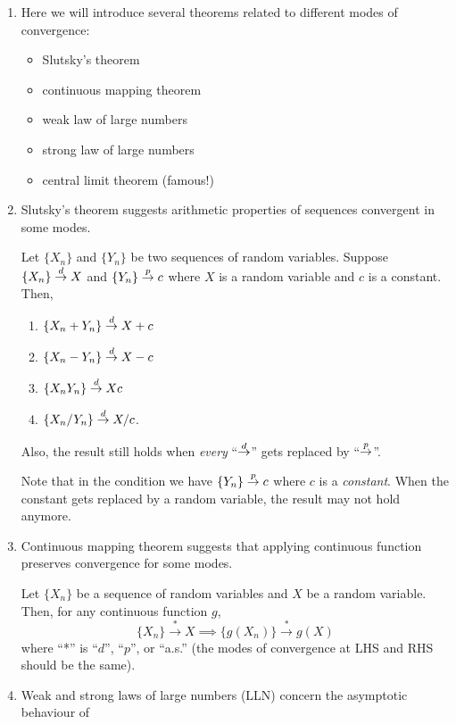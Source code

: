 \begin{enumerate}
\item Here we will introduce several theorems related to different modes of
convergence:
\begin{itemize}
\item Slutsky's theorem
\item continuous mapping theorem
\item weak law of large numbers
\item strong law of large numbers
\item central limit theorem (famous!)
\end{itemize}
\item Slutsky's theorem suggests arithmetic properties of sequences convergent
in some modes.
\begin{theorem}
\label{thm:slutsky-thm}
Let \(\{X_n\}\) and \(\{Y_n\}\) be two sequences of random variables.
Suppose \(\{X_n\}\overset{d}{\to} X\) and \(\{Y_n\}\overset{p}{\to} c\) where \(X\) is a random
variable and \(c\) is a constant. Then,
\begin{enumerate}
\item \(\{X_n+Y_n\}\overset{d}{\to} X+c\)
\item \(\{X_n-Y_n\}\overset{d}{\to} X-c\)
\item \(\{X_nY_n\}\overset{d}{\to} Xc\)
\item \(\{X_n/Y_n\}\overset{d}{\to} X/c\).
\end{enumerate}
Also, the result still holds when \emph{every} ``\(\overset{d}{\to}\)'' gets replaced by
``\(\overset{p}{\to}\)''.
\end{theorem}
\begin{warning}
Note that in the condition we have \(\{Y_n\}\overset{p}{\to} c\) where \(c\) is a
\emph{constant}. When the constant gets replaced by a random variable, the
result may not hold anymore.
\end{warning}
\item Continuous mapping theorem suggests that applying continuous function
preserves convergence for some modes.
\begin{theorem}
\label{thm:cts-mapping-thm}
Let \(\{X_n\}\) be a sequence of random variables and \(X\) be a random variable.
Then, for any continuous function \(g\),
\[
\{X_n\}\overset{*}\to X\implies
\{g(X_n)\}\overset{*}\to g(X)
\]
where ``*'' is ``\(d\)'', ``\(p\)'', or ``a.s.'' (the modes of convergence at LHS
and RHS should be the same).
\end{theorem}
\item Weak and strong laws of large numbers (LLN) concern the asymptotic behaviour of

\end{enumerate}
